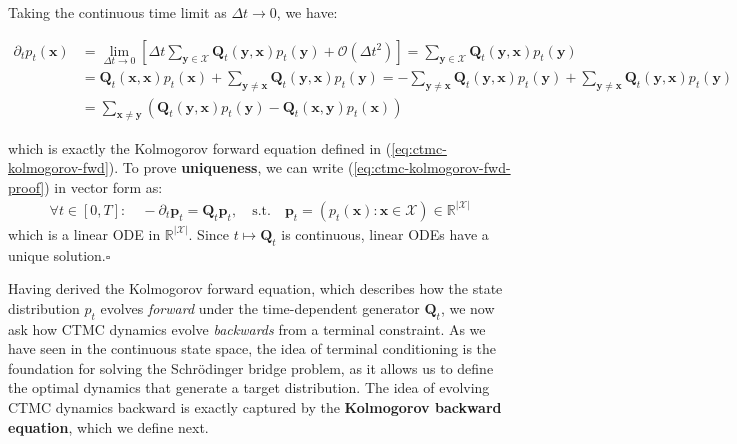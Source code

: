 \documentclass{article}
\newcommand{\boldtext}[1]{\textbf{\textcolor{MyGreen}{#1}}}
\begin{document}
Taking the continuous time limit as $\Delta t\to 0$, we have:
\begin{small}
\begin{align}
\partial_tp_t(\boldsymbol{x})&=\lim_{\Delta t\to 0}\left[\Delta t\sum_{\boldsymbol{y}\in \mathcal{X}}\boldsymbol{Q}_t(\boldsymbol{y},\boldsymbol{x})p_t(\boldsymbol{y})+\mathcal{O}(\Delta t^2)\right]=\sum_{\boldsymbol{y}\in \mathcal{X}}\boldsymbol{Q}_t(\boldsymbol{y},\boldsymbol{x})p_t(\boldsymbol{y})\nonumber\\
&=\boldsymbol{Q}_t(\boldsymbol{x},\boldsymbol{x})p_t(\boldsymbol{x})+\sum_{\boldsymbol{y}\neq \boldsymbol{x}}\boldsymbol{Q}_t(\boldsymbol{y},\boldsymbol{x})p_t(\boldsymbol{y})=-\sum_{\boldsymbol{y}\neq \boldsymbol{x}}\boldsymbol{Q}_t(\boldsymbol{y},\boldsymbol{x})p_t(\boldsymbol{y})+\sum_{\boldsymbol{y}\neq \boldsymbol{x}}\boldsymbol{Q}_t(\boldsymbol{y},\boldsymbol{x})p_t(\boldsymbol{y})\nonumber\\
&=\sum_{\boldsymbol{x}\neq\boldsymbol{y}}\left(\boldsymbol{Q}_t(\boldsymbol{y}, \boldsymbol{x})p_t(\boldsymbol{y})-\boldsymbol{Q}_t(\boldsymbol{x},\boldsymbol{y})p_t(\boldsymbol{x})\right)\label{eq:ctmc-kolmogorov-fwd-proof}
\end{align}
\end{small}
which is exactly the Kolmogorov forward equation defined in (\ref{eq:ctmc-kolmogorov-fwd}). To prove \textbf{uniqueness}, we can write (\ref{eq:ctmc-kolmogorov-fwd-proof}) in vector form as: 
\begin{align}
    \forall t\in [0,T ]: \quad-\partial_t\boldsymbol{p}_t=\boldsymbol{Q}_t\boldsymbol{p}_t, \quad \text{s.t.}\quad \boldsymbol{p}_t=(p_t(\boldsymbol{x}):\boldsymbol{x}\in \mathcal{X})\in \mathbb{R}^{|\mathcal{X}|}
\end{align}
which is a linear ODE in $\mathbb{R}^{|\mathcal{X}|}$. Since $t\mapsto \boldsymbol{Q}_t$ is continuous, linear ODEs have a unique solution.\hfill $\square$

Having derived the Kolmogorov forward equation, which describes how the state distribution $p_t$ evolves \textit{forward} under the time-dependent generator $\boldsymbol{Q}_t$, we now ask how CTMC dynamics evolve \textit{backwards} from a terminal constraint. As we have seen in the continuous state space, the idea of terminal conditioning is the foundation for solving the Schrödinger bridge problem, as it allows us to define the optimal dynamics that generate a target distribution. The idea of evolving CTMC dynamics backward is exactly captured by the \boldtext{Kolmogorov backward equation}, which we define next.
\end{document}
